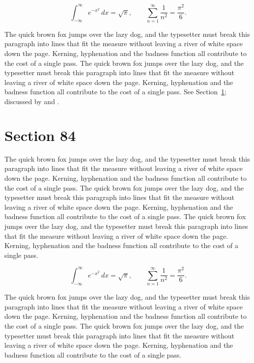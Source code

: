 \documentclass{article}
\begin{document}
\begin{equation}\label{eq:83}
\int_{-\infty}^{\infty} e^{-x^{2}}\,dx = \sqrt{\pi}, \qquad
\sum_{n=1}^{\infty} \frac{1}{n^{2}} = \frac{\pi^{2}}{6}.
\end{equation}

The quick brown fox jumps over the lazy dog, and the typesetter must break this paragraph into lines that fit the measure without leaving a river of white space down the page. Kerning, hyphenation and the badness function all contribute to the cost of a single pass. The quick brown fox jumps over the lazy dog, and the typesetter must break this paragraph into lines that fit the measure without leaving a river of white space down the page. Kerning, hyphenation and the badness function all contribute to the cost of a single pass. 
See Section~\ref{sec:84}; discussed by \textcite{k4} and \textcite{l1}.
\section{Section 84}
\label{sec:84}
The quick brown fox jumps over the lazy dog, and the typesetter must break this paragraph into lines that fit the measure without leaving a river of white space down the page. Kerning, hyphenation and the badness function all contribute to the cost of a single pass. The quick brown fox jumps over the lazy dog, and the typesetter must break this paragraph into lines that fit the measure without leaving a river of white space down the page. Kerning, hyphenation and the badness function all contribute to the cost of a single pass. The quick brown fox jumps over the lazy dog, and the typesetter must break this paragraph into lines that fit the measure without leaving a river of white space down the page. Kerning, hyphenation and the badness function all contribute to the cost of a single pass. 

\begin{equation}\label{eq:84}
\int_{-\infty}^{\infty} e^{-x^{2}}\,dx = \sqrt{\pi}, \qquad
\sum_{n=1}^{\infty} \frac{1}{n^{2}} = \frac{\pi^{2}}{6}.
\end{equation}

The quick brown fox jumps over the lazy dog, and the typesetter must break this paragraph into lines that fit the measure without leaving a river of white space down the page. Kerning, hyphenation and the badness function all contribute to the cost of a single pass. The quick brown fox jumps over the lazy dog, and the typesetter must break this paragraph into lines that fit the measure without leaving a river of white space down the page. Kerning, hyphenation and the badness function all contribute to the cost of a single pass. 
\end{document}
